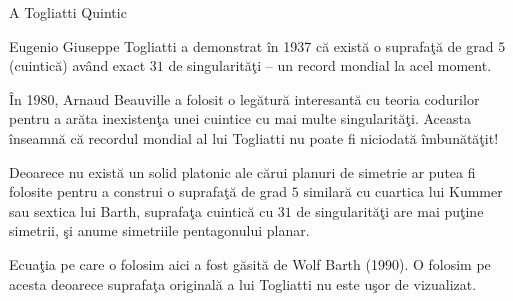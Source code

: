 \begin{surferPage}{A Togliatti Quintic}

   Eugenio Giuseppe Togliatti a demonstrat \^{i}n 1937 c\u{a} exist\u{a} o suprafa\c{t}\u{a} de grad $5$ (cuintic\u{a}) av\^{a}nd exact $31$ de singularit\u{a}\c{t}i 
    -- un record mondial la acel moment.
   
    \^{I}n 1980, Arnaud Beauville a folosit o leg\u{a}tur\u{a} interesant\u{a} cu teoria codurilor pentru a ar\u{a}ta inexisten\c{t}a unei cuintice cu mai multe singularit\u{a}\c{t}i.
    Aceasta \^{i}nseamn\u{a} c\u{a} recordul mondial al lui Togliatti nu poate fi niciodat\u{a} \^{i}mbun\u{a}t\u{a}\c{t}it!

      
    Deoarece nu exist\u{a} un solid platonic ale c\u{a}rui planuri de simetrie ar putea fi folosite 
    pentru a construi o suprafa\c{t}\u{a} de grad $5$ similar\u{a} cu cuartica lui Kummer sau
    sextica lui Barth, suprafa\c{t}a cuintic\u{a} cu $31$ de singularit\u{a}\c{t}i are mai pu\c{t}ine 
    simetrii, \c{s}i anume simetriile pentagonului planar.
    
    Ecua\c{t}ia pe care o folosim aici a fost g\u{a}sit\u{a} de Wolf Barth (1990). O folosim pe acesta
    deoarece suprafa\c{t}a original\u{a} a lui Togliatti nu este u\c{s}or de vizualizat.
    
\end{surferPage}
